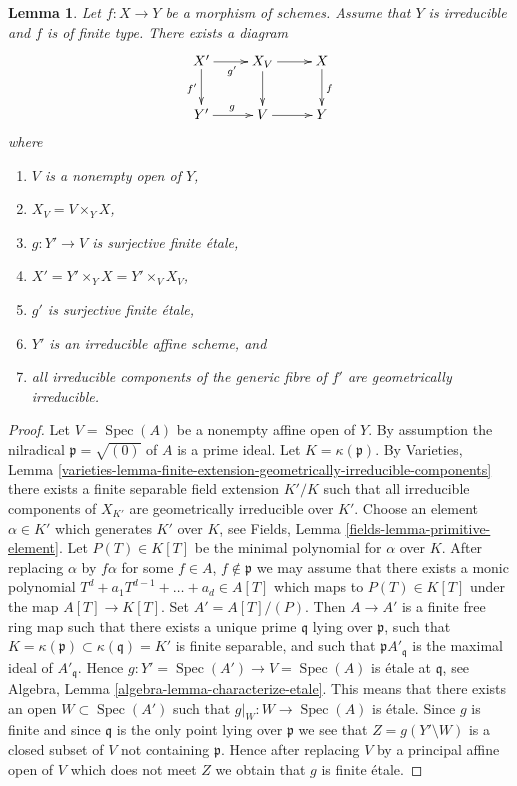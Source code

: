 \documentclass[10pt,a4paper]{amsart}
\theoremstyle{plain}
\newtheorem{lemma}[subsection]{Lemma}
\theoremstyle{definition}
\theoremstyle{remark}
\numberwithin{equation}{subsection}
\def\Spec{\mathop{\mathrm{Spec}}}
\begin{document}
\begin{lemma}
\label{lemma-make-components-generic-fibre-geometrically-irreducible}
Let $f : X \to Y$ be a morphism of schemes.
Assume that $Y$ is irreducible and $f$ is of finite type.
There exists a diagram
$$
\xymatrix{
X' \ar[d]_{f'} \ar[r]_{g'} & X_V \ar[r] \ar[d] & X \ar[d]^f \\
Y' \ar[r]^g & V \ar[r] & Y
}
$$
where
\begin{enumerate}
\item $V$ is a nonempty open of $Y$,
\item $X_V = V \times_Y X$,
\item $g : Y' \to V$ is surjective finite \'etale,
\item $X' = Y' \times_Y X = Y' \times_V X_V$,
\item $g'$ is surjective finite \'etale,
\item $Y'$ is an irreducible affine scheme, and
\item all irreducible components of the generic fibre of $f'$
are geometrically irreducible.
\end{enumerate}
\end{lemma}

\begin{proof}
Let $V = \Spec(A)$ be a nonempty affine open of $Y$.
By assumption the nilradical $\mathfrak p = \sqrt{(0)}$ of $A$ is a prime ideal.
Let $K = \kappa(\mathfrak p)$. By
Varieties, Lemma
\ref{varieties-lemma-finite-extension-geometrically-irreducible-components}
there exists a finite separable field extension
$K'/K$ such that all irreducible components of $X_{K'}$ are
geometrically irreducible over $K'$.
Choose an element $\alpha \in K'$ which generates $K'$ over
$K$, see
Fields, Lemma \ref{fields-lemma-primitive-element}.
Let $P(T) \in K[T]$ be the minimal polynomial for $\alpha$ over $K$.
After replacing $\alpha$ by $f \alpha$ for some
$f \in A$, $f \not \in \mathfrak p$
we may assume that there exists a monic polynomial
$T^d + a_1T^{d - 1} + \ldots + a_d \in A[T]$ which maps to
$P(T) \in K[T]$ under the map $A[T] \to K[T]$.
Set $A' = A[T]/(P)$. Then $A \to A'$ is a finite free ring map
such that there exists a unique prime $\mathfrak q$ lying over
$\mathfrak p$, such that
$K = \kappa(\mathfrak p) \subset \kappa(\mathfrak q) = K'$
is finite separable, and such that $\mathfrak pA'_{\mathfrak q}$
is the maximal ideal of $A'_{\mathfrak q}$.
Hence $g : Y' = \Spec(A') \to V = \Spec(A)$
is \'etale at $\mathfrak q$, see
Algebra, Lemma \ref{algebra-lemma-characterize-etale}.
This means that there exists an open $W \subset \Spec(A')$ such
that $g|_W : W \to \Spec(A)$ is \'etale.
Since $g$ is finite and since $\mathfrak q$ is the only point lying over
$\mathfrak p$ we see that $Z = g(Y' \setminus W)$ is a closed subset of $V$
not containing $\mathfrak p$. Hence after replacing $V$ by a principal
affine open of $V$ which does not meet $Z$ we obtain that $g$ is finite
\'etale.
\end{proof}
\end{document}
